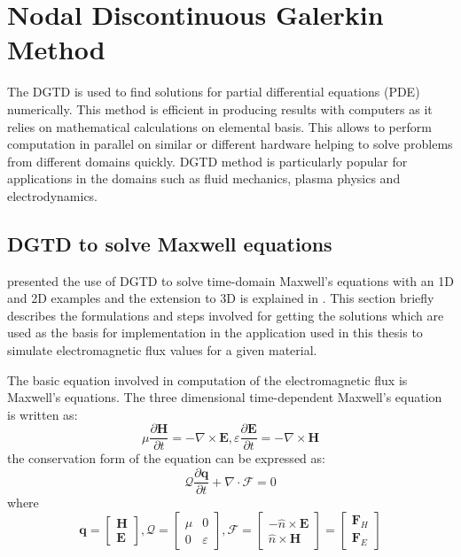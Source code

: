 \section{Nodal Discontinuous Galerkin Method}
\label{sec:dgtd}

The \ac{DGTD} \cite{hesthaven_nodal_2008} is used to find solutions
for partial differential equations (PDE) numerically. This method is efficient in
producing results with computers as it relies on mathematical calculations on elemental basis.
This allows to perform computation in parallel on similar or different hardware helping to
solve problems from different domains quickly. \ac{DGTD} method is particularly popular for applications
in the domains such as fluid mechanics, plasma physics and electrodynamics.

\subsection{DGTD to solve Maxwell equations}
\label{sec:dgtd_maxwell}

\textcite{Hesthaven_190449} presented the use of \ac{DGTD} to solve time-domain Maxwell's equations with
an 1D and 2D examples and the extension to 3D is explained in \cite{hesthaven_nodal_2008}. This section
briefly describes the formulations and steps involved for getting the solutions which are
used as the basis for implementation in the application used in this thesis to simulate
electromagnetic flux values for a given material.

The basic equation involved in computation of the electromagnetic flux is Maxwell's equations. The
three dimensional time-dependent Maxwell's equation \cite{hesthaven_nodal_2008} is written as:
\begin{equation}\label{eqn:maxwellbase}
    \mu \frac{\partial{\textbf{H}}}{\partial{t}} = - \nabla \times \textbf{E},\varepsilon \frac{\partial{\textbf{E}}}{ \partial{t}} = - \nabla  \times \textbf{H}
\end{equation}
the conservation form of the equation can be expressed as:
\begin{equation}\label{eqn:maxwell}
    \mathcal{Q}\frac{\partial\textbf{q}}{\partial{t}}  + \nabla  \cdot \mathcal{F} = 0
\end{equation}
where
\begin{equation}\label{eqn:maxwellexpansion}
\textbf{q} =  \begin{bmatrix}\textbf{H} \\ \textbf{E} \end{bmatrix},
\mathcal{Q} =  \begin{bmatrix} \mu & 0 \\ 0 &  \varepsilon \end{bmatrix},
\mathcal{F} = \begin{bmatrix}  - \widehat{n} \times \textbf{E} \\ \widehat{n} \times \textbf{H} \end{bmatrix} = \begin{bmatrix} \textbf{F}_H \\ \textbf{F}_E \end{bmatrix}
\end{equation}

